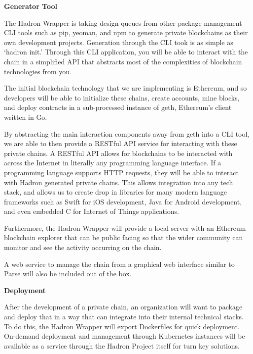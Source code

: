 \documentclass{article}
\begin{document}
\begin{center}
\textbf{Generator Tool}
\end{center}

The Hadron Wrapper is taking design queues from other package management CLI tools such as pip, yeoman, and npm to generate private blockchains as their own development projects. Generation through the CLI took is as simple as ‘hadron init.’ Through this CLI application, you will be able to interact with the chain in a simplified API that abstracts most of the complexities of blockchain technologies from you.

The initial blockchain technology that we are implementing is Ethereum, and so developers will be able to initialize these chains, create accounts, mine blocks, and deploy contracts in a sub-processed instance of geth, Ethereum’s client written in Go.

By abstracting the main interaction components away from geth into a CLI tool, we are able to then provide a RESTful API service for interacting with these private chains. A RESTful API allows for blockchains to be interacted with across the Internet in literally any programming language interface. If a programming language supports HTTP requests, they will be able to interact with Hadron generated private chains. This allows integration into any tech stack, and allows us to create drop in libraries for many modern language frameworks such as Swift for iOS development, Java for Android development, and even embedded C for Internet of Things applications.

Furthermore, the Hadron Wrapper will provide a local server with an Ethereum blockchain explorer that can be public facing so that the wider community can monitor and see the activity occurring on the chain.

A web service to manage the chain from a graphical web interface similar to Parse will also be included out of the box.

\begin{center}
\textbf{Deployment}
\end{center}

After the development of a private chain, an organization will want to package and deploy that in a way that can integrate into their internal technical stacks. To do this, the Hadron Wrapper will export Dockerfiles for quick deployment. On-demand deployment and management through Kubernetes instances will be available as a service through the Hadron Project itself for turn key solutions.
\end{document}
